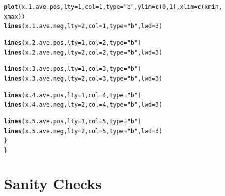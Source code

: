 \documentclass{article}\usepackage[]{graphicx}\usepackage[]{color}
\makeatletter
\newcommand{\hlnum}[1]{\textcolor[rgb]{0.686,0.059,0.569}{#1}}%
\newcommand{\hlstr}[1]{\textcolor[rgb]{0.192,0.494,0.8}{#1}}%
\newcommand{\hlstd}[1]{\textcolor[rgb]{0.345,0.345,0.345}{#1}}%
\newcommand{\hlkwc}[1]{\textcolor[rgb]{0.333,0.667,0.333}{#1}}%
\newcommand{\hlkwd}[1]{\textcolor[rgb]{0.737,0.353,0.396}{\textbf{#1}}}%
\newenvironment{kframe}{%
 \def\at@end@of@kframe{}%
 \ifinner\ifhmode%
  \def\at@end@of@kframe{\end{minipage}}%
  \begin{minipage}{\columnwidth}%
 \fi\fi%
 \def\FrameCommand##1{\hskip\@totalleftmargin \hskip-\fboxsep
 \colorbox{shadecolor}{##1}\hskip-\fboxsep
     \hskip-\linewidth \hskip-\@totalleftmargin \hskip\columnwidth}%
 \MakeFramed {\advance\hsize-\width
   \@totalleftmargin\z@ \linewidth\hsize
   \@setminipage}}%
 {\par\unskip\endMakeFramed%
 \at@end@of@kframe}
\newenvironment{knitrout}{}{} %
\makeatother
\begin{document}
\begin{knitrout}
\begin{kframe}
\begin{alltt}
        \hlkwd{plot}\hlstd{(x.1.ave.pos,} \hlkwc{lty} \hlstd{=} \hlnum{1}\hlstd{,} \hlkwc{col} \hlstd{=} \hlnum{1}\hlstd{,} \hlkwc{type} \hlstd{=} \hlstr{"b"}\hlstd{,} \hlkwc{ylim} \hlstd{=} \hlkwd{c}\hlstd{(}\hlnum{0}\hlstd{,} \hlnum{1}\hlstd{),} \hlkwc{xlim} \hlstd{=} \hlkwd{c}\hlstd{(xmin,}
            \hlstd{xmax))}
        \hlkwd{lines}\hlstd{(x.1.ave.neg,} \hlkwc{lty} \hlstd{=} \hlnum{2}\hlstd{,} \hlkwc{col} \hlstd{=} \hlnum{1}\hlstd{,} \hlkwc{type} \hlstd{=} \hlstr{"b"}\hlstd{,} \hlkwc{lwd} \hlstd{=} \hlnum{3}\hlstd{)}

        \hlkwd{lines}\hlstd{(x.2.ave.pos,} \hlkwc{lty} \hlstd{=} \hlnum{1}\hlstd{,} \hlkwc{col} \hlstd{=} \hlnum{2}\hlstd{,} \hlkwc{type} \hlstd{=} \hlstr{"b"}\hlstd{)}
        \hlkwd{lines}\hlstd{(x.2.ave.neg,} \hlkwc{lty} \hlstd{=} \hlnum{2}\hlstd{,} \hlkwc{col} \hlstd{=} \hlnum{2}\hlstd{,} \hlkwc{type} \hlstd{=} \hlstr{"b"}\hlstd{,} \hlkwc{lwd} \hlstd{=} \hlnum{3}\hlstd{)}

        \hlkwd{lines}\hlstd{(x.3.ave.pos,} \hlkwc{lty} \hlstd{=} \hlnum{1}\hlstd{,} \hlkwc{col} \hlstd{=} \hlnum{3}\hlstd{,} \hlkwc{type} \hlstd{=} \hlstr{"b"}\hlstd{)}
        \hlkwd{lines}\hlstd{(x.3.ave.neg,} \hlkwc{lty} \hlstd{=} \hlnum{2}\hlstd{,} \hlkwc{col} \hlstd{=} \hlnum{3}\hlstd{,} \hlkwc{type} \hlstd{=} \hlstr{"b"}\hlstd{,} \hlkwc{lwd} \hlstd{=} \hlnum{3}\hlstd{)}

        \hlkwd{lines}\hlstd{(x.4.ave.pos,} \hlkwc{lty} \hlstd{=} \hlnum{1}\hlstd{,} \hlkwc{col} \hlstd{=} \hlnum{4}\hlstd{,} \hlkwc{type} \hlstd{=} \hlstr{"b"}\hlstd{)}
        \hlkwd{lines}\hlstd{(x.4.ave.neg,} \hlkwc{lty} \hlstd{=} \hlnum{2}\hlstd{,} \hlkwc{col} \hlstd{=} \hlnum{4}\hlstd{,} \hlkwc{type} \hlstd{=} \hlstr{"b"}\hlstd{,} \hlkwc{lwd} \hlstd{=} \hlnum{3}\hlstd{)}

        \hlkwd{lines}\hlstd{(x.5.ave.pos,} \hlkwc{lty} \hlstd{=} \hlnum{1}\hlstd{,} \hlkwc{col} \hlstd{=} \hlnum{5}\hlstd{,} \hlkwc{type} \hlstd{=} \hlstr{"b"}\hlstd{)}
        \hlkwd{lines}\hlstd{(x.5.ave.neg,} \hlkwc{lty} \hlstd{=} \hlnum{2}\hlstd{,} \hlkwc{col} \hlstd{=} \hlnum{5}\hlstd{,} \hlkwc{type} \hlstd{=} \hlstr{"b"}\hlstd{,} \hlkwc{lwd} \hlstd{=} \hlnum{3}\hlstd{)}
    \hlstd{\}}
\hlstd{\}}
\end{alltt}
\end{kframe}
\end{knitrout}


\newpage

\section{Sanity Checks}
\label{sec:sanity-checks}
\end{document}
